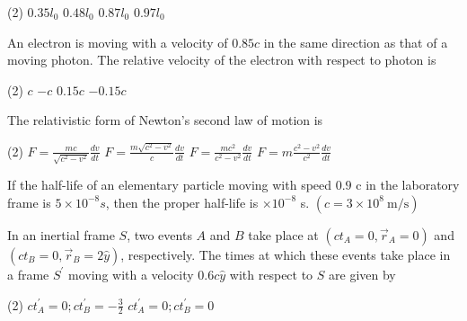 \begin{enumerate}
\begin{minipage}{\textwidth}
\end{minipage}
\begin{tasks}(2)
	\task[\textbf{A.}] $0.35 l_{0}$
	\task[\textbf{B.}]$0.48 l_{0}$
	\task[\textbf{C.}]$0.87 l_{0}$
	\task[\textbf{D.}]$0.97 l_{0}$
\end{tasks}
\begin{minipage}{\textwidth}
	\item An electron is moving with a velocity of $0.85 c$ in the same direction as that of a moving photon. The relative velocity of the electron with respect to photon is
\end{minipage}
\begin{tasks}(2)
	\task[\textbf{A.}] $c$
	\task[\textbf{B.}]$-c$
	\task[\textbf{C.}] $0.15 c$
	\task[\textbf{D.}]$-0.15 c$
\end{tasks}
\begin{minipage}{\textwidth}
	\item  The relativistic form of Newton's second law of motion is 
\end{minipage}
\begin{tasks}(2)
	\task[\textbf{A.}] $F=\frac{m c}{\sqrt{c^{2}-v^{2}}} \frac{d v}{d t}$ 
	\task[\textbf{B.}]$F=\frac{m \sqrt{c^{2}-v^{2}}}{c} \frac{d v}{d t}$
	\task[\textbf{C.}]$F=\frac{m c^{2}}{c^{2}-v^{2}} \frac{d v}{d t}$
	\task[\textbf{D.}]$F=m \frac{c^{2}-v^{2}}{c^{2}} \frac{d v}{d t}$
\end{tasks}
\begin{minipage}{\textwidth}
	\item If the half-life of an elementary particle moving with speed $0.9$ c in the laboratory frame is $5 \times 10^{-8} s$, then the proper half-life is $\times 10^{-8}$ s. $\left(c=3 \times 10^{8} \mathrm{~m} / \mathrm{s}\right)$
\end{minipage}
\begin{minipage}{\textwidth}
	\item In an inertial frame $S$, two events $A$ and $B$ take place at $\left(c t_{A}=0, \vec{r}_{A}=0\right)$ and $\left(c t_{B}=0, \vec{r}_{B}=2 \hat{y}\right)$, respectively. The times at which these events take place in a frame $S^{\prime}$ moving with a velocity $0.6 c \hat{y}$ with respect to $S$ are given by
\end{minipage}
\begin{tasks}(2)
	\task[\textbf{A.}] $c t_{A}^{\prime}=0 ; c t_{B}^{\prime}=-\frac{3}{2}$
	\task[\textbf{B.}]$c t_{A}^{\prime}=0 ; c t_{B}^{\prime}=0$

\end{tasks}
\end{enumerate}
